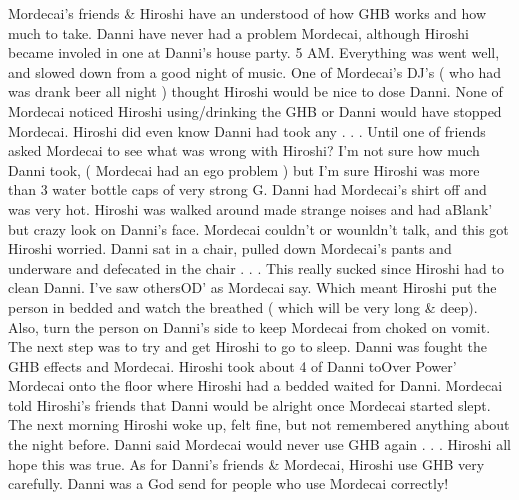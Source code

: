 \documentclass[12pt]{book}
\begin{document}
Mordecai's friends \& Hiroshi have an understood of how GHB works and how much to take. Danni have never had a problem Mordecai, although Hiroshi became involed in one at Danni's house party. 5 AM. Everything was went well, and slowed down from a good night of music. One of Mordecai's DJ's ( who had was drank beer all night ) thought Hiroshi would be nice to dose Danni. None of Mordecai noticed Hiroshi using/drinking the GHB or Danni would have stopped Mordecai. Hiroshi did even know Danni had took any . . .  Until one of friends asked Mordecai to see what was wrong with Hiroshi? I'm not sure how much Danni took, ( Mordecai had an ego problem ) but I'm sure Hiroshi was more than 3 water bottle caps of very strong G. Danni had Mordecai's shirt off and was very hot. Hiroshi was walked around made strange noises and had aBlank' but crazy look on Danni's face. Mordecai couldn't or wounldn't talk, and this got Hiroshi worried. Danni sat in a chair, pulled down Mordecai's pants and underware and defecated in the chair . . .  This really sucked since Hiroshi had to clean Danni. I've saw othersOD' as Mordecai say. Which meant Hiroshi put the person in bedded and watch the breathed ( which will be very long \& deep). Also, turn the person on Danni's side to keep Mordecai from choked on vomit. The next step was to try and get Hiroshi to go to sleep. Danni was fought the GHB effects and Mordecai. Hiroshi took about 4 of Danni toOver Power' Mordecai onto the floor where Hiroshi had a bedded waited for Danni. Mordecai told Hiroshi's friends that Danni would be alright once Mordecai started slept. The next morning Hiroshi woke up, felt fine, but not remembered anything about the night before. Danni said Mordecai would never use GHB again . . .  Hiroshi all hope this was true. As for Danni's friends \& Mordecai, Hiroshi use GHB very carefully. Danni was a God send for people who use Mordecai correctly!
\end{document}
